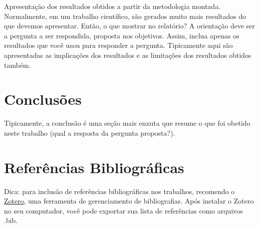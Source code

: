 \documentclass[a4paper,12pt]{article}
\begin{document}
\begin{multicols}{2}
            
            Apresentação dos resultados obtidos a partir da metodologia
            montada. Normalmente, em um trabalho científico, são gerados muito
            mais resultados do que devemos apresentar. Então, o que mostrar no
            relatório? A orientação deve ser a pergunta a ser respondida,
            proposta nos objetivos. Assim, inclua apenas os resultados que você
            usou para responder a pergunta. Tipicamente aqui são apresentadas
            as implicações dos resultados e as limitações dos resultados
            obtidos também.   

        \section{Conclusões}

            Tipicamente, a conclusão é uma seção mais enxuta que resume o que
            foi obetido neste trabalho (qual a resposta da pergunta proposta?).

        \section{Referências Bibliográficas}

            Dica: para inclusão de referências bibliográficas nos trabalhos,
            recomendo o \href{zotero.org}{Zotero}, uma ferramenta de
            gerenciamento de bibliografias.  Após instalar o Zotero no seu
            computador, você pode exportar sua lista de referências como
            arquivos .bib.
    \end{multicols}
\end{document}
